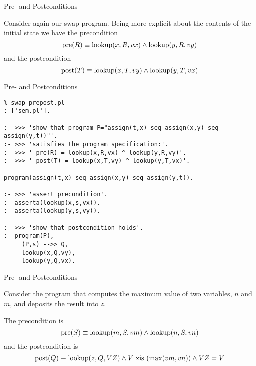 \documentclass{beamer}
\begin{document}
\begin{frame}[fragile]{Pre- and Postconditions}

\small

Consider again our swap program.  Being more explicit about the contents
of the initial state we have the precondition
\[
{\rm pre}(R) \equiv  {\rm lookup}(x,R,vx) \wedge {\rm lookup}(y,R,vy)
\]
and the postcondition
\[
{\rm post}(T) \equiv  {\rm lookup}(x,T,vy) \wedge {\rm lookup}(y,T,vx)
\]
\end{frame}


\begin{frame}[fragile]{Pre- and Postconditions}

{\scriptsize
\begin{verbatim}
% swap-prepost.pl
:-['sem.pl'].

:- >>> 'show that program P="assign(t,x) seq assign(x,y) seq assign(y,t))"'.
:- >>> 'satisfies the program specification:'.
:- >>> ' pre(R) = lookup(x,R,vx) ^ lookup(y,R,vy)'.
:- >>> ' post(T) = lookup(x,T,vy) ^ lookup(y,T,vx)'.

program(assign(t,x) seq assign(x,y) seq assign(y,t)).                                              
                                                                                                   
:- >>> 'assert precondition'.                                                                      
:- asserta(lookup(x,s,vx)).
:- asserta(lookup(y,s,vy)).                                                                        
                                                                                                   
:- >>> 'show that postcondition holds'.                                                            
:- program(P),
     (P,s) -->> Q,
     lookup(x,Q,vy),
     lookup(y,Q,vx).                                                                               
\end{verbatim}
}
\end{frame}

\begin{frame}[fragile]{Pre- and Postconditions}

\small

Consider the program that computes the maximum value of two variables, $n$ and $m$,
and deposits the result into $z$.

\vspace{.1in}

The precondition is
\[
{\rm pre}(S) \equiv {\rm lookup}(m,S,vm) \wedge {\rm lookup}(n,S,vn)
\]
and the postcondition is
\[
{\rm post}(Q) \equiv {\rm lookup}(z,Q,VZ) \wedge V \mbox{ xis }({\rm max}(vm,vn)) \wedge VZ = V
\]
\end{frame}
\end{document}

